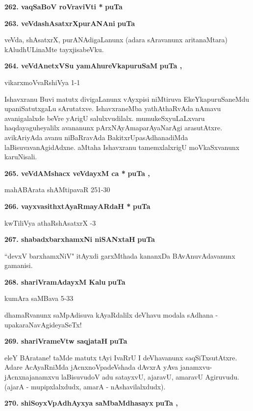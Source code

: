 \medskip
\noindent
\textbf{262. vaqSaBoV roVraviVti *} \hfill{\bf puTa }

\eject

\noindent
\textbf{263. veVdashAsatxrXpurANAni} \hfill{\bf puTa }

\smallskip
veVda, shAsatxrX, purANAdigaLanunx (adara sAravanunx aritanaMtara) kAludhULinaMte tayxjisabeVku.

\medskip
\noindent
\textbf{264. veVdAnetxVSu yamAhureVkapuruSaM} \hfill{\bf puTa , }

\hfill{vikarxmoVvaRshiVya 1-1}

\smallskip
Ishavxranu Buvi matutx divigaLanunx vAyxpisi niMtiruva EkeYkapuruSaneMdu upaniSatutxgaLu sArutatxve. IshavxraneMba yathAthaRvAda nAmavu avanigalalxde beVre yArigU salulxvudilalx. mumukeSxyuLaLxvaru haqdayaguheyalilx avananunx pArxNAyAmaparAyaNarAgi arasutAtxre. avikAriyAda avanu niBaRravAda BakitxrUpasAdhanadiMda laBisuvavanAgidAdxne. aMtaha Ishavxranu tamemxlalxrigU moVkaSxvanunx karuNisali.

\medskip
\noindent
\textbf{265. veVdAMshacx veVdayxM ca *} \hfill{\bf puTa , }

\hfill{mahABArata shAMtipavaR 251-30}

\medskip
\noindent
\textbf{266. vayxvasithxtAyaRmayARdaH *} \hfill{\bf puTa }

\hfill{kwTiliVya athaRshAsatxrX -3}

\medskip
\noindent
\textbf{267. shabadxbarxhamxNi niSANxtaH} \hfill{\bf puTa }

\smallskip
``devxV barxhamxNiV" itAyxdi garxMthada kananxDa BAvAnuvAdavanunx gamanisi.

\medskip
\noindent
\textbf{268. shariVramAdayxM Kalu} \hfill{\bf puTa }

\hfill{kumAra saMBava 5-33}

\smallskip
dhamaRvanunx saMpAdisuva kAyaRdalilx deVhavu modala sAdhana - upakaraNavAgideyaSeTx!

\medskip
\noindent
\textbf{269. shariVrameVtw saqjataH} \hfill{\bf puTa }

\smallskip
eleY BAratane! taMde matutx tAyi IvaRrU I deVhavanunx saqSiTxsutAtxre. Adare AcAyaRniMda jAcnxnoVpadeVshada dAvxrA yAva janamxvu-jAcnxnajanamxvu laBisuvudoV adu satayxvU, ajaravU, amaravU Agiruvudu. (ajarA - mupipxlalxdudx, amarA - nAshavilalxdudx).


\medskip
\noindent
\textbf{270. shiSoyxVpAdhAyxya saMbaMdhasayx} \hfill{\bf puTa , }

